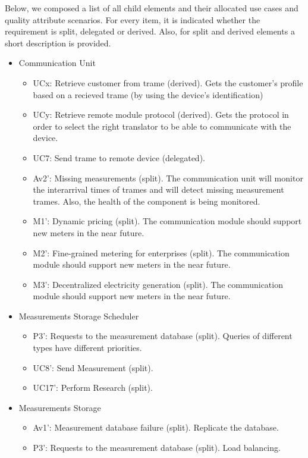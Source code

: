 \npar Below, we composed a list of all child elements and their allocated use
cases and quality attribute scenarios. For every item, it is indicated whether
the requirement is split, delegated or derived. Also, for split and derived
elements a short description is provided.

\begin{itemize}
	\item Communication Unit
	\begin{itemize}
	  	\item UCx: Retrieve customer from trame (derived). Gets the customer's
	  	profile based on a recieved trame (by using the device's identification)
	  	\item UCy: Retrieve remote module protocol (derived). Gets the protocol in
	  	order to select the right translator to be able to communicate with the device. 
		\item UC7: Send trame to remote device (delegated). 
		\item Av2': Missing measurements (split). The communication unit will monitor
		the interarrival times of trames and will detect missing measurement trames.
		Also, the health of the component is being monitored.
		\item M1': Dynamic pricing (split). The communication module should support
		new meters in the near future. 
		\item M2': Fine-grained metering for enterprises (split). The communication
		module should support new meters in the near future. 
		\item M3': Decentralized electricity generation (split). The communication
		module should support new meters in the near future.
	\end{itemize}
	\item Measurements Storage Scheduler
	\begin{itemize}
		\item P3': Requests to the measurement database (split). Queries of different
		types have different priorities.
		\item UC8': Send Measurement (split). 
		\item UC17': Perform Research (split). 
	\end{itemize}
	\item Measurements Storage
	\begin{itemize}
		\item Av1': Measurement database failure (split). Replicate the database.
	  	\item P3': Requests to the measurement database (split). Load balancing.

\end{itemize}
\end{itemize}
